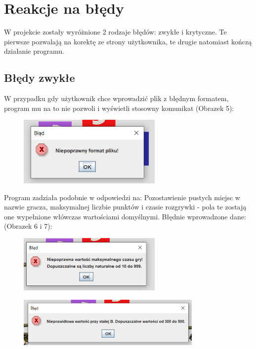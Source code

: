 \documentclass{article}
\begin{document}
\section{Reakcje na błędy}
W projekcie zostały wyróżnione 2 rodzaje błędów: zwykłe i krytyczne. Te pierwsze pozwalają na korektę ze strony użytkownika, te drugie natomiast kończą działanie programu.

\subsection{Błędy zwykłe}

W przypadku gdy użytkownik chce wprowadzić plik z błędnym formatem, program mu na to nie pozwoli i wyświetli stosowny komunikat (Obrazek 5):
\begin{figure} [hbt!]
    \centering
    \includegraphics[width=7cm]{blad_1.png}
\end{figure}
\newline
Program zadziała podobnie w odpowiedzi na:
\newline Pozostawienie pustych miejsc w nazwie gracza, maksymalnej liczbie punktów i czasie rozgrywki - pola te zostają one wypełnione włówczas wartościami domyślnymi.
\newline
Błędnie wprowadzone dane: (Obrazek 6 i 7):
\begin{figure} [hbt!]
    \centering
    \includegraphics[width=7cm]{blad_2.png}
\end{figure}

\begin{figure} [hbt!]
    \centering
    \includegraphics[width=9cm]{blad_3.png}
\end{figure}
\end{document}
